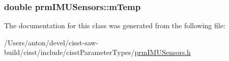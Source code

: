 \subsubsection[{m\+Temp}]{\setlength{\rightskip}{0pt plus 5cm}double prm\+I\+M\+U\+Sensors\+::m\+Temp\hspace{0.3cm}{\ttfamily [protected]}}\label{classprm_i_m_u_sensors_ab62434fbd875d0f7428761be427b5825}


The documentation for this class was generated from the following file\+:\begin{DoxyCompactItemize}
\item 
/\+Users/anton/devel/cisst-\/saw-\/build/cisst/include/cisst\+Parameter\+Types/\hyperlink{prm_i_m_u_sensors_8h}{prm\+I\+M\+U\+Sensors.\+h}\end{DoxyCompactItemize}
